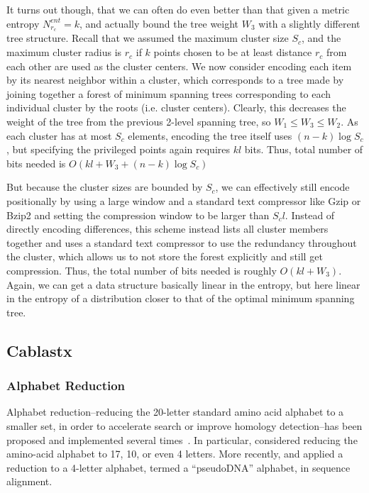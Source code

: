 \documentclass[review,preprint,12pt]{elsarticle}
\theoremstyle{definition}
\theoremstyle{remark}
\numberwithin{equation}{section}
\begin{document}
It turns out though, that we can often do even better than that given a metric entropy $N_{r_c}^{ent} = k$, and actually bound the tree weight $W_3$ with a slightly different tree structure.
Recall that we assumed the maximum cluster size $S_c$, and the maximum cluster radius is $r_c$ if $k$ points chosen to be at least distance $r_c$ from each other are used as the cluster centers.
We now consider encoding each item by its nearest neighbor within a cluster, which corresponds to a tree made by joining together a forest of minimum spanning trees corresponding to each individual cluster by the roots (i.e. cluster centers).
Clearly, this decreases the weight of the tree from the previous 2-level spanning tree, so $W_1 \le W_3 \le W_2$.
As each cluster has at most $S_c$ elements, encoding the tree itself uses $(n-k)\log S_c$, but specifying the privileged points again requires $kl$ bits.
Thus, total number of bits needed is $O(kl + W_3 + (n-k)\log S_c )$

But because the cluster sizes are bounded by $S_c$, we can effectively still encode positionally by using a large window and a standard text compressor like Gzip or Bzip2 and setting the compression window to be larger than $S_c l$.
Instead of directly encoding differences, this scheme instead lists all cluster members together and uses a standard text compressor to use the redundancy throughout the cluster, which allows us to not store the forest explicitly and still get compression.
Thus, the total number of bits needed is roughly $O(kl + W_3)$. Again, we can get a data structure basically linear in the entropy, but here linear in the entropy of a distribution closer to that of the optimal minimum spanning tree.

\subsection{Cablastx}

\subsubsection*{Alphabet Reduction}

Alphabet reduction--reducing the 20-letter standard amino acid alphabet to a
smaller set, in order to accelerate search or improve homology detection--has
been proposed and implemented several times~\cite{blah}.
In particular, \citet{Murphy:2000, Peterson:2009} considered reducing the
amino-acid alphabet to 17, 10, or even 4 letters.
More recently, \citet{Zhao:2012} and \citet{Huson:2013} applied a reduction to
a 4-letter alphabet, termed a ``pseudoDNA'' alphabet, in sequence alignment.
\end{document}
